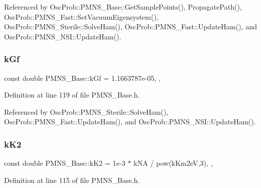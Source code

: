Referenced by Osc\+Prob\+::\+P\+M\+N\+S\+\_\+\+Base\+::\+Get\+Sample\+Points(), Propagate\+Path(), Osc\+Prob\+::\+P\+M\+N\+S\+\_\+\+Fast\+::\+Set\+Vacuum\+Eigensystem(), Osc\+Prob\+::\+P\+M\+N\+S\+\_\+\+Sterile\+::\+Solve\+Ham(), Osc\+Prob\+::\+P\+M\+N\+S\+\_\+\+Fast\+::\+Update\+Ham(), and Osc\+Prob\+::\+P\+M\+N\+S\+\_\+\+N\+S\+I\+::\+Update\+Ham().

\mbox{\label{classOscProb_1_1PMNS__Base_a7f26a3456128234b2ae6cc9141a6532f}} 
\subsubsection{\texorpdfstring{k\+Gf}{kGf}}
{\footnotesize\ttfamily const double P\+M\+N\+S\+\_\+\+Base\+::k\+Gf = 1.\+1663787e-\/05\hspace{0.3cm}{\ttfamily [static]}, {\ttfamily [protected]}, {\ttfamily [inherited]}}



Definition at line 119 of file P\+M\+N\+S\+\_\+\+Base.\+h.



Referenced by Osc\+Prob\+::\+P\+M\+N\+S\+\_\+\+Sterile\+::\+Solve\+Ham(), Osc\+Prob\+::\+P\+M\+N\+S\+\_\+\+Fast\+::\+Update\+Ham(), and Osc\+Prob\+::\+P\+M\+N\+S\+\_\+\+N\+S\+I\+::\+Update\+Ham().

\mbox{\label{classOscProb_1_1PMNS__Base_a326fc5016d7dd7ce05682c06cdcb6d94}} 
\subsubsection{\texorpdfstring{k\+K2}{kK2}}
{\footnotesize\ttfamily const double P\+M\+N\+S\+\_\+\+Base\+::k\+K2 = 1e-\/3 $\ast$ k\+N\+A / pow(k\+Km2e\+V,3)\hspace{0.3cm}{\ttfamily [static]}, {\ttfamily [protected]}, {\ttfamily [inherited]}}



Definition at line 115 of file P\+M\+N\+S\+\_\+\+Base.\+h.




